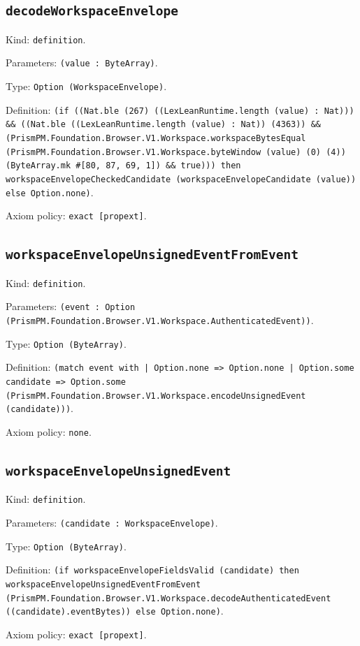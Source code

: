\documentclass[11pt]{article}
\begin{document}
\subsection*{\texttt{decodeWorkspaceEnvelope}}
\noindent Kind: \texttt{definition}.\par
\noindent Parameters: \texttt{(value : ByteArray)}.\par
\noindent Type: \texttt{Option (WorkspaceEnvelope)}.\par
\noindent Definition: \texttt{(if ((Nat.ble (267) ((LexLeanRuntime.length (value) : Nat))) \&\& ((Nat.ble ((LexLeanRuntime.length (value) : Nat)) (4363)) \&\& (PrismPM.Foundation.Browser.V1.Workspace.workspaceBytesEqual (PrismPM.Foundation.Browser.V1.Workspace.byteWindow (value) (0) (4)) (ByteArray.mk \#[80, 87, 69, 1]) \&\& true))) then workspaceEnvelopeCheckedCandidate (workspaceEnvelopeCandidate (value)) else Option.none)}.\par
\noindent Axiom policy: \texttt{exact [propext]}.\par
\subsection*{\texttt{workspaceEnvelopeUnsignedEventFromEvent}}
\noindent Kind: \texttt{definition}.\par
\noindent Parameters: \texttt{(event : Option (PrismPM.Foundation.Browser.V1.Workspace.AuthenticatedEvent))}.\par
\noindent Type: \texttt{Option (ByteArray)}.\par
\noindent Definition: \texttt{(match event with | Option.none => Option.none | Option.some candidate => Option.some (PrismPM.Foundation.Browser.V1.Workspace.encodeUnsignedEvent (candidate)))}.\par
\noindent Axiom policy: \texttt{none}.\par
\subsection*{\texttt{workspaceEnvelopeUnsignedEvent}}
\noindent Kind: \texttt{definition}.\par
\noindent Parameters: \texttt{(candidate : WorkspaceEnvelope)}.\par
\noindent Type: \texttt{Option (ByteArray)}.\par
\noindent Definition: \texttt{(if workspaceEnvelopeFieldsValid (candidate) then workspaceEnvelopeUnsignedEventFromEvent (PrismPM.Foundation.Browser.V1.Workspace.decodeAuthenticatedEvent ((candidate).eventBytes)) else Option.none)}.\par
\noindent Axiom policy: \texttt{exact [propext]}.\par
\end{document}
